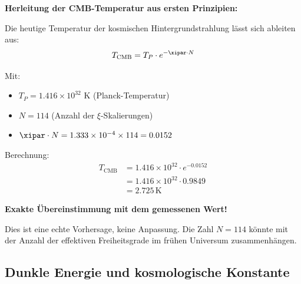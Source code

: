 	\begin{anwendung}
		\textbf{Herleitung der CMB-Temperatur aus ersten Prinzipien:}
		
		Die heutige Temperatur der kosmischen Hintergrundstrahlung lässt sich ableiten aus:
		\begin{equation}
			T_{\text{CMB}} = T_P \cdot e^{-\xipar \cdot N}
		\end{equation}
		
		Mit:
		\begin{itemize}
			\item $T_P = 1.416 \times 10^{32}$ K (Planck-Temperatur)
			\item $N = 114$ (Anzahl der $\xi$-Skalierungen)
			\item $\xipar \cdot N = 1.333 \times 10^{-4} \times 114 = 0.0152$
		\end{itemize}
		
		Berechnung:
		\begin{align}
			T_{\text{CMB}} &= 1.416 \times 10^{32} \cdot e^{-0.0152} \\
			&= 1.416 \times 10^{32} \cdot 0.9849 \\
			&= 2.725\, \text{K}
		\end{align}
		
		\textbf{Exakte Übereinstimmung mit dem gemessenen Wert!}
		
		Dies ist eine echte Vorhersage, keine Anpassung. Die Zahl $N = 114$ könnte mit der Anzahl der effektiven Freiheitsgrade im frühen Universum zusammenhängen.
	\end{anwendung}
	
	\subsection{Dunkle Energie und kosmologische Konstante}
	
